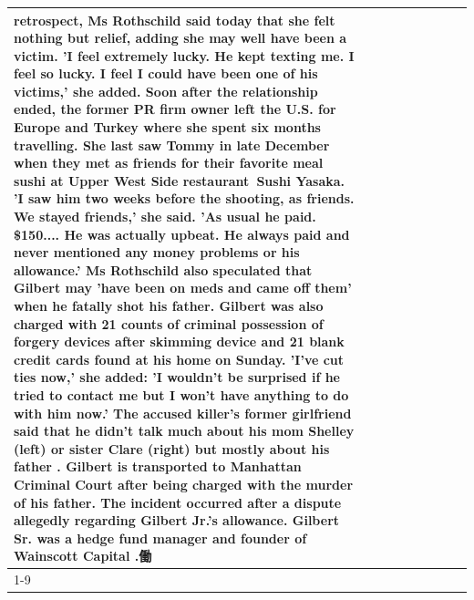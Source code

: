 \begin{table}[H]
\begin{tabular}{lllrlllll}
retrospect, Ms Rothschild said today that she felt nothing but relief, adding she may well have been a victim. 'I feel extremely lucky. He kept texting me. I feel so lucky. I feel I could have been one of his victims,' she added. Soon after the relationship ended, the former PR firm owner left the U.S. for Europe and Turkey where she spent six months  travelling. She last saw Tommy in late December when they met as friends for their favorite meal sushi at Upper West Side restaurant Sushi Yasaka. 'I saw him two weeks before the shooting, as friends. We stayed friends,' she said. 'As usual he paid. \$150.... He was actually upbeat. He always paid and never mentioned any money problems or his allowance.' Ms Rothschild also speculated that Gilbert may 'have been on meds and came off them' when he fatally shot his father. Gilbert was also charged with 21 counts of criminal possession of forgery devices after skimming device and 21 blank credit cards found at his home on Sunday. 'I've cut ties now,' she added: 'I wouldn’t be surprised if he tried to contact me but I won’t have anything to do with him now.' The accused killer's former girlfriend said that he didn't talk much about his mom Shelley (left) or sister Clare (right) but mostly about his father . Gilbert is transported to Manhattan Criminal Court  after being charged with the murder of his father. The incident occurred after a dispute allegedly regarding Gilbert Jr.'s allowance. Gilbert Sr. was a hedge fund manager and founder of Wainscott Capital .働 \\
\cline{1-9} \cline{2-9}

\end{tabular}
\end{table}
